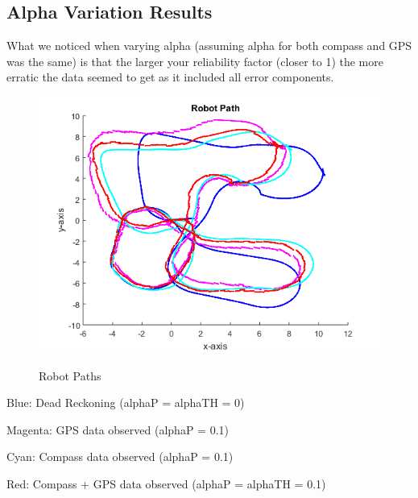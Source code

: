 	\subsection{Alpha Variation Results}
	What we noticed when varying alpha (assuming alpha for both compass and GPS was the same) is that the larger your reliability factor (closer to 1) the more erratic the data seemed to get as it included all error components.
		\vspace{3cm}
		\begin{figure}[position = here]
			\begin{centering}
				\includegraphics[scale=1]{./images/q1/q1_01}\\
				\caption[\textit{A3}]{Robot Paths\label{RobotPaths}}
			\end{centering}
		\end{figure}
			\newline
			
			\begin{list}{)~}{}
					\item Blue:	Dead Reckoning (alphaP = alphaTH = 0)
					\item Magenta: GPS data observed (alphaP = 0.1)
					\item Cyan: Compass data observed (alphaP = 0.1)					
					\item Red: Compass + GPS data observed	(alphaP = alphaTH = 0.1)
			\end{list}
		
		\pagebreak
